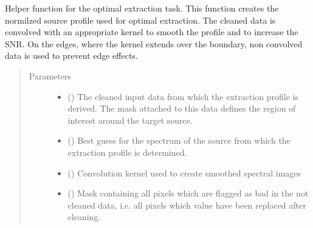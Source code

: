 \documentclass[a4paper,10pt,english]{sphinxmanual}
\begin{document}
\begin{fulllineitems}
\begin{fulllineitems}
\begin{quote}
\begin{description}
\end{description}\end{quote}

\end{fulllineitems}


\begin{fulllineitems}
\label{\detokenize{cascade.TSO:cascade.TSO.TSO.TSOSuite._create_extraction_profile}}
Helper function for the optimal extraction task.
This function creates the normilzed source profile used for optimal
extraction. The cleaned data is convolved with an appropriate kernel
to smooth the profile and to increase the SNR. On the edges, where the
kernel extends over the boundary, non convolved data is used to
prevent edge effects.
\begin{quote}\begin{description}
\item[{Parameters}] \leavevmode\begin{itemize}
\item {} 
 () \textendash{} The cleaned input data from which the extraction profile is
derived. The mask attached to this data defines the region of
interest around the target source.

\item {} 
 () \textendash{} Best guess for the spectrum of the source from which the extraction
profile is determined.

\item {} 
 () \textendash{} Convolution kernel used to create smoothed spectral images

\item {} 
 () \textendash{} Mask containing all pixels which are flagged as bad in the not
cleaned data, i.e. all pixels which value have been replaced
after cleaning.


\end{itemize}
\end{description}
\end{quote}
\end{fulllineitems}
\end{fulllineitems}
\end{document}
